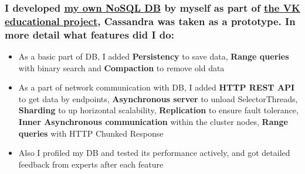 \documentclass[11pt]{article}
\begin{document}
\subsubsection{I developed \href{https://github.com/polis-vk/2022-highload-dht/tree/main/src/main/java/ok/dht/test/kovalenko}{\underline{my own NoSQL DB}} by myself as part of \href{https://education.vk.company/}{\underline{the VK educational project}}, Cassandra was taken as a prototype. In more detail what features did I do:}
\begin{itemize}
    \item As a basic part of DB, I added \textbf{Persistency} to save data, \textbf{Range queries} with binary search and \textbf{Compaction} to remove old data
    \item As a part of network communication with DB, I added \textbf{HTTP REST API} to get data by endpoints, \textbf{Asynchronous server} to unload SelectorThreads, \textbf{Sharding} to up horizontal scalability, \textbf{Replication} to ensure fault tolerance, \textbf{Inner Asynchronous communication} within the cluster nodes, \textbf{Range queries} with HTTP Chunked Response
    \item Also I profiled my DB and tested its performance actively, and got detailed feedback from experts after each feature
\end{itemize}

\begin{comment}
\subsection{\href{https://github.com/PaaavelZ/tinkoff_bot}{\underline{Pet-project}} $|$ {\normalfont\textit{Python Developer}} \hfill June 2022 -- July 2022}
\subsubsection{\underline{\textbf{Stack}: Python, \href{https://github.com/python-telegram-bot/python-telegram-bot}{Telegram API}, SQLite, \href{https://github.com/Tinkoff/invest-python}{Tinkoff API}}}
\subsubsection{I developed \href{https://github.com/PaaavelZ/tinkoff_bot}{\underline{a Telegram financial bot}} for personal use. In more detail what did I do:}
\begin{itemize}
    \item I created \textbf{a SQLite database class interface} to organize and access all application data
    \item I implemented \textbf{the forming and sending aggregated reports} of \href{https://www.tinkoff.ru/invest/}{\underline{the Tinkoff Invest's}} daily trade statistics for chosen accounts as well as the Tinkoff Investment App but it is available only for a month officially
    \item I also added the \textbf{subscription's capabilities} to be able to independently write to the bot and receive personal reports from it
\end{itemize}
\end{comment}
\end{document}
